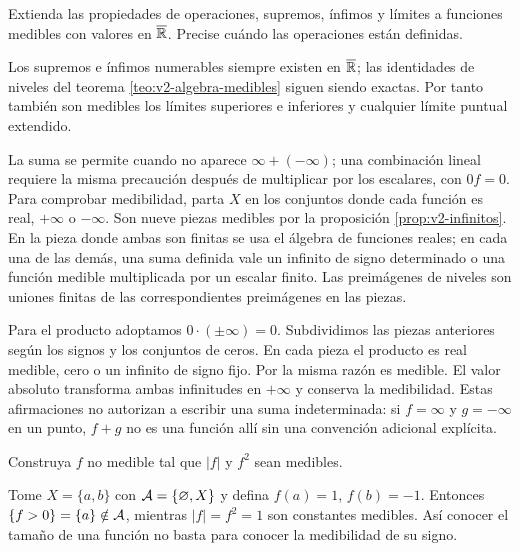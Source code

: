 \begin{ejercicio}\label{ej:v2-l03-2}
Extienda las propiedades de operaciones, supremos, ínfimos y límites a funciones medibles con valores en $\overline{\mathbb R}$. Precise cuándo las operaciones están definidas.
\end{ejercicio}
\begin{solucion}
Los supremos e ínfimos numerables siempre existen en $\overline{\mathbb R}$; las identidades de niveles del teorema \ref{teo:v2-algebra-medibles} siguen siendo exactas. Por tanto también son medibles los límites superiores e inferiores y cualquier límite puntual extendido.

La suma se permite cuando no aparece $\infty+(-\infty)$; una combinación lineal requiere la misma precaución después de multiplicar por los escalares, con $0f=0$. Para comprobar medibilidad, parta $X$ en los conjuntos donde cada función es real, $+\infty$ o $-\infty$. Son nueve piezas medibles por la proposición \ref{prop:v2-infinitos}. En la pieza donde ambas son finitas se usa el álgebra de funciones reales; en cada una de las demás, una suma definida vale un infinito de signo determinado o una función medible multiplicada por un escalar finito. Las preimágenes de niveles son uniones finitas de las correspondientes preimágenes en las piezas.

Para el producto adoptamos $0\cdot(\pm\infty)=0$. Subdividimos las piezas anteriores según los signos y los conjuntos de ceros. En cada pieza el producto es real medible, cero o un infinito de signo fijo. Por la misma razón es medible. El valor absoluto transforma ambas infinitudes en $+\infty$ y conserva la medibilidad. Estas afirmaciones no autorizan a escribir una suma indeterminada: si $f=\infty$ y $g=-\infty$ en un punto, $f+g$ no es una función allí sin una convención adicional explícita.
\end{solucion}

\begin{ejercicio}\label{ej:v2-l03-3}
Construya $f$ no medible tal que $|f|$ y $f^2$ sean medibles.
\end{ejercicio}
\begin{solucion}
Tome $X=\{a,b\}$ con $\mathcal A=\{\varnothing,X\}$ y defina $f(a)=1$, $f(b)=-1$. Entonces $\{f>0\}=\{a\}\notin\mathcal A$, mientras $|f|=f^2=1$ son constantes medibles. Así conocer el tamaño de una función no basta para conocer la medibilidad de su signo.
\end{solucion}

